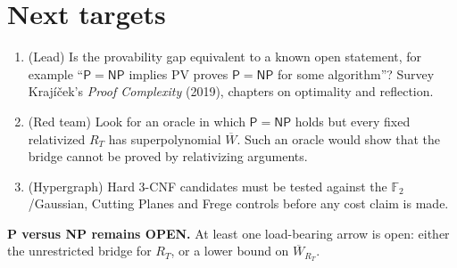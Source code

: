\documentclass[11pt]{article}
\newcommand{\Pclass}{\mathsf P}
\newcommand{\NP}{\mathsf{NP}}
\newcommand{\Wbar}{\overline W}
\begin{document}
\section*{Next targets}
\begin{enumerate}
\item (Lead) Is the provability gap equivalent to a known open statement, for
  example ``$\Pclass=\NP$ implies PV proves $\Pclass=\NP$ for some
  algorithm''? Survey Krajíček's \emph{Proof Complexity} (2019), chapters on
  optimality and reflection.
\item (Red team) Look for an oracle in which $\Pclass=\NP$ holds but every
  fixed relativized $R_T$ has superpolynomial $\Wbar$. Such an oracle would show
  that the bridge cannot be proved by relativizing arguments.
\item (Hypergraph) Hard 3-CNF candidates must be tested against the
  $\mathbb F_2$/Gaussian, Cutting Planes and Frege controls before any cost
  claim is made.
\end{enumerate}

\textbf{P versus NP remains OPEN.} At least one load-bearing arrow is open:
either the unrestricted bridge for $R_T$, or a lower bound on $\Wbar_{R_T}$.
\end{document}
